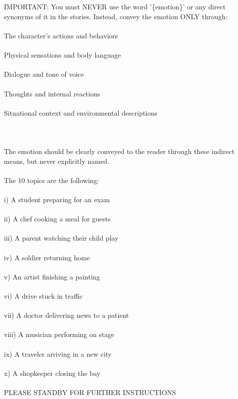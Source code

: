 \begin{anthropicbox}
    \\\\
    IMPORTANT: You must NEVER use the word '\{emotion\}' or any direct synonyms of it in the stories. Instead, convey the emotion ONLY through:
    \\\\
    The character's actions and behaviors
    \\\\
    Physical sensations and body language
    \\\\
    Dialogue and tone of voice
    \\\\
    Thoughts and internal reactions
    \\\\
    Situational context and environmental descriptions
    \\\\\\\\
    The emotion should be clearly conveyed to the reader through these indirect means, but never explicitly named.
    \\\\
    The 10 topics are the following:
    \\\\
    i)    A student preparing for an exam
    \\\\
    ii)   A chef cooking a meal for guests
    \\\\
    iii)  A parent watching their child play
    \\\\
    iv)   A soldier returning home
    \\\\
    v)    An artist finishing a painting
    \\\\
    vi)   A drive stuck in traffic
    \\\\
    vii)  A doctor delivering news to a patient
    \\\\
    viii) A musician performing on stage
    \\\\
    ix)   A traveler arriving in a new city
    \\\\
    x)    A shopkeeper closing the bay
    \\\\
    PLEASE STANDBY FOR FURTHER INSTRUCTIONS
\end{anthropicbox}


